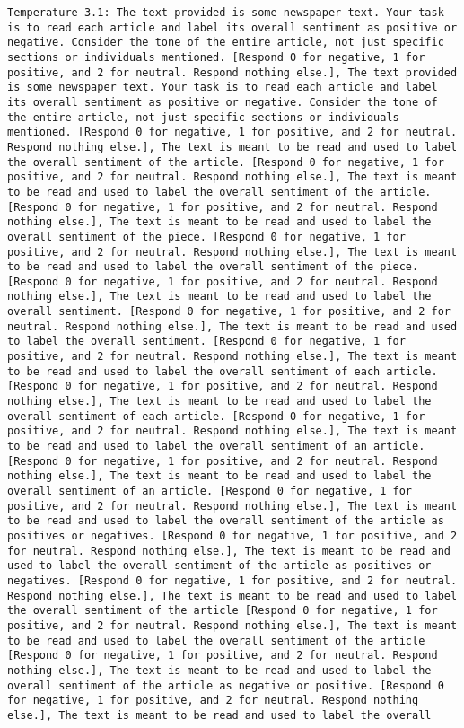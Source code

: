 \begin{lstlisting}[label=lst:poor_performing_prompts]
	Temperature 3.1: The text provided is some newspaper text. Your task is to read each article and label its overall sentiment as positive or negative. Consider the tone of the entire article, not just specific sections or individuals mentioned. [Respond 0 for negative, 1 for positive, and 2 for neutral. Respond nothing else.], The text provided is some newspaper text. Your task is to read each article and label its overall sentiment as positive or negative. Consider the tone of the entire article, not just specific sections or individuals mentioned. [Respond 0 for negative, 1 for positive, and 2 for neutral. Respond nothing else.], The text is meant to be read and used to label the overall sentiment of the article. [Respond 0 for negative, 1 for positive, and 2 for neutral. Respond nothing else.], The text is meant to be read and used to label the overall sentiment of the article. [Respond 0 for negative, 1 for positive, and 2 for neutral. Respond nothing else.], The text is meant to be read and used to label the overall sentiment of the piece. [Respond 0 for negative, 1 for positive, and 2 for neutral. Respond nothing else.], The text is meant to be read and used to label the overall sentiment of the piece. [Respond 0 for negative, 1 for positive, and 2 for neutral. Respond nothing else.], The text is meant to be read and used to label the overall sentiment. [Respond 0 for negative, 1 for positive, and 2 for neutral. Respond nothing else.], The text is meant to be read and used to label the overall sentiment. [Respond 0 for negative, 1 for positive, and 2 for neutral. Respond nothing else.], The text is meant to be read and used to label the overall sentiment of each article. [Respond 0 for negative, 1 for positive, and 2 for neutral. Respond nothing else.], The text is meant to be read and used to label the overall sentiment of each article. [Respond 0 for negative, 1 for positive, and 2 for neutral. Respond nothing else.], The text is meant to be read and used to label the overall sentiment of an article. [Respond 0 for negative, 1 for positive, and 2 for neutral. Respond nothing else.], The text is meant to be read and used to label the overall sentiment of an article. [Respond 0 for negative, 1 for positive, and 2 for neutral. Respond nothing else.], The text is meant to be read and used to label the overall sentiment of the article as positives or negatives. [Respond 0 for negative, 1 for positive, and 2 for neutral. Respond nothing else.], The text is meant to be read and used to label the overall sentiment of the article as positives or negatives. [Respond 0 for negative, 1 for positive, and 2 for neutral. Respond nothing else.], The text is meant to be read and used to label the overall sentiment of the article [Respond 0 for negative, 1 for positive, and 2 for neutral. Respond nothing else.], The text is meant to be read and used to label the overall sentiment of the article [Respond 0 for negative, 1 for positive, and 2 for neutral. Respond nothing else.], The text is meant to be read and used to label the overall sentiment of the article as negative or positive. [Respond 0 for negative, 1 for positive, and 2 for neutral. Respond nothing else.], The text is meant to be read and used to label the overall 
\end{lstlisting}
